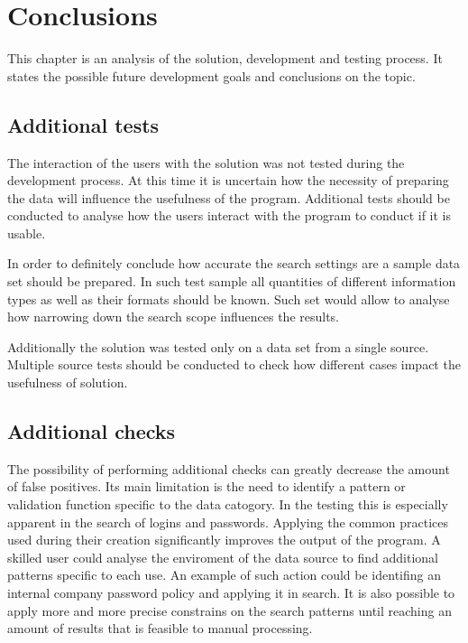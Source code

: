 \documentclass[a4paper,twoside,12pt]{book}
\begin{document}
\chapter{Conclusions}

This chapter is an analysis of the solution, development and testing process. It states the possible future development goals and conclusions on the topic.

\section{Additional tests}

The interaction of the users with the solution was not tested during the development process.
At this time it is uncertain how the necessity of preparing the data will influence the usefulness
of the program. Additional tests should be conducted to analyse how the users interact with the
program to conduct if it is usable. 

In order to definitely conclude how accurate the search settings are a sample data set should be prepared.
In such test sample all quantities of different information types as well as their formats should be known.
Such set would allow to analyse how narrowing down the search scope influences the results.

Additionally the solution was tested only on a data set from a single source. Multiple source 
tests should be conducted to check how different cases impact the usefulness of solution. 

\section{Additional checks}

The possibility of performing additional checks can greatly decrease the amount of false positives.
Its main limitation is the need to identify a pattern or validation function specific to the data catogory.
In the testing this is especially apparent in the search of logins and passwords. Applying the common practices 
used during their creation significantly improves the output of the program. 
A skilled user could analyse the enviroment of the data source to find additional patterns specific to each use.
An example of such action could be identifing an internal company password policy and applying it in search.
It is also possible to apply more and more precise constrains on the search patterns until reaching an amount of 
results that is feasible to manual processing. 
\end{document}
